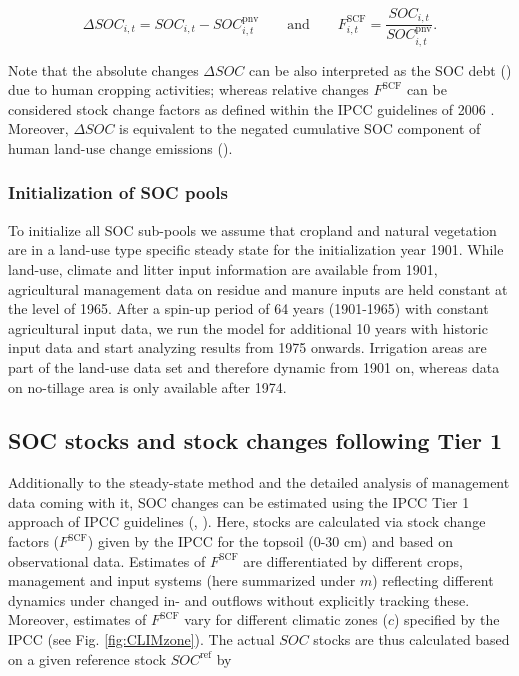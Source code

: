 \documentclass[gc, manuscript]{copernicus}
\begin{document}
\begin{equation}
\Delta SOC_{i,t} = SOC_{i,t} - SOC^{\mathrm{pnv}}_{i,t}\qquad \text{and} \qquad  F^{\mathrm{SCF}}_{i,t} = \frac{SOC_{i,t}}{SOC^{\mathrm{pnv}}_{i,t}} .
\label{eq:stockdiff}
\end{equation}

Note that the absolute changes \(\Delta SOC\) can be also interpreted as the SOC debt (\citep{sanderman_soil_2017}) due to human cropping activities; whereas relative changes \(F^{\mathrm{SCF}}\) can be considered stock change factors as defined within the IPCC guidelines of 2006 \citep{eggleston_ipcc_2006}. Moreover, \(\Delta SOC\) is equivalent to the negated cumulative SOC component of human land-use change emissions (\citep{pugh_simulated_2015}).

\hypertarget{sec:initsoc}{%
\subsubsection{Initialization of SOC pools}\label{sec:initsoc}}

To initialize all SOC sub-pools we assume that cropland and natural vegetation are in a land-use type specific steady state for the initialization year 1901. While land-use, climate and litter input information are available from 1901, agricultural management data on residue and manure inputs are held constant at the level of 1965. After a spin-up period of 64 years (1901-1965) with constant agricultural input data, we run the model for additional 10 years with historic input data and start analyzing results from 1975 onwards. Irrigation areas are part of the land-use data set and therefore dynamic from 1901 on, whereas data on no-tillage area is only available after 1974.

\hypertarget{sec:tier1}{%
\subsection{SOC stocks and stock changes following Tier 1}\label{sec:tier1}}

Additionally to the steady-state method \citep{calvo_buendia_ipcc_2019} and the detailed analysis of management data coming with it, SOC changes can be estimated using the IPCC Tier 1 approach of IPCC guidelines (\citep{eggleston_ipcc_2006}, \citep{calvo_buendia_ipcc_2019}). Here, stocks are calculated via stock change factors (\(F^{\mathrm{SCF}}\)) given by the IPCC for the topsoil (0-30 cm) and based on observational data. Estimates of \(F^{\mathrm{SCF}}\) are differentiated by different crops, management and input systems (here summarized under \(m\)) reflecting different dynamics under changed in- and outflows without explicitly tracking these. Moreover, estimates of \(F^{\mathrm{SCF}}\) vary for different climatic zones (\(c\)) specified by the IPCC (see Fig. \ref{fig:CLIMzone}). The actual \(SOC\) stocks are thus calculated based on a given reference stock \(SOC^{\mathrm{ref}}\) by
\end{document}
